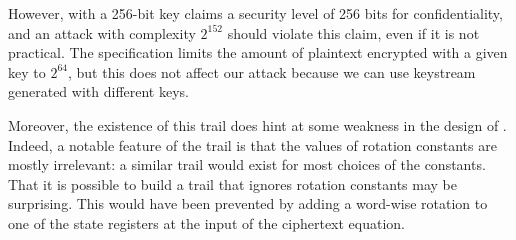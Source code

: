 However,  with a 256-bit key claims a security level
of 256 bits for confidentiality, and an attack with complexity $2^{152}$
should violate this claim, even if it is not practical.  The
 specification limits the amount of plaintext encrypted
with a given key to $2^{64}$, but this does not affect our attack
because we can use keystream generated with different keys.

Moreover, the existence of this trail does hint at some weakness in the
design of . Indeed, a notable feature of the trail is that
the values of rotation constants are mostly irrelevant: a similar trail
would exist for most choices of the constants. That it is possible to
build a trail that ignores rotation constants may be surprising. This
would have been prevented by adding a word-wise rotation to one of the
state registers at the input of the ciphertext equation.

